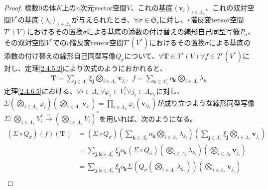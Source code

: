 \documentclass[dvipdfmx]{jsarticle}
\begin{document}
\begin{proof}
標数$0$の体$K$上の$n$次元vector空間$V$、これの基底$\left\langle \mathbf{v}_{i} \right\rangle_{i \in \varLambda_{n}}$、これの双対空間$V^{*}$の基底$\left\langle \lambda_{i} \right\rangle_{i \in \varLambda_{n}}$が与えられたとき、$\forall\sigma \in \mathfrak{S}_{r}$に対し、$r$階反変tensor空間$T^{r}(V)$におけるその置換$\sigma$による基底の添数の付け替えの線形自己同型写像$P_{\sigma}$、その双対空間$V^{*}$での$r$階反変tensor空間$T^{r}(V^{*})$におけるその置換$\sigma$による基底の添数の付け替えの線形自己同型写像$Q_{\sigma}$について、$\forall\mathbf{T} \in T^{r}(V)\forall f \in T^{r}\left( V^{*} \right)$に対し、定理\ref{2.4.5.2}により次式のようにおかれると、
\begin{align*}
\mathbf{T} = \sum_{\mathbf{j} \in \varLambda_{n}^{r}} {\xi_{\mathbf{j}}\bigotimes_{i \in \varLambda_{r}} \mathbf{v}_{j_{i}}},\ \ f = \sum_{\mathbf{k} \in \varLambda_{n}^{r}} {o_{\mathbf{k}}\bigotimes_{i \in \varLambda_{r}} \lambda_{k_{i}}}
\end{align*}
定理\ref{2.4.6.5}における、$\forall i \in \varLambda_{n}\forall\varphi_{i} \in V_{i}^{*}\forall j_{i} \in \varLambda_{m_{i}}$に対し、$\varSigma\left( \bigotimes_{i \in \varLambda_{n}} \varphi_{i} \right)\left( \bigotimes_{i \in \varLambda_{n}} \mathbf{v}_{j_{i}} \right) = \prod_{i \in \varLambda_{n}} {\varphi_{i}\left( \mathbf{v}_{ij_{i}} \right)}$が成り立つような線形同型写像$\varSigma:\bigotimes_{i \in \varLambda_{n}} V_{i}^{*}\overset{\sim}{\rightarrow}\left( \bigotimes_{i \in \varLambda_{n}} V_{i} \right)^{*}$を用いれば、次のようになる。
\begin{align*}
\left( \varSigma \circ Q_{\sigma} \right)(f)\left( \mathbf{T} \right) &= \left( \varSigma \circ Q_{\sigma} \right)\left( \sum_{\mathbf{k} \in \varLambda_{n}^{r}} {o_{\mathbf{k}}\bigotimes_{i \in \varLambda_{r}} \lambda_{k_{i}}} \right)\left( \sum_{\mathbf{j} \in \varLambda_{n}^{r}} {\xi_{\mathbf{j}}\bigotimes_{i \in \varLambda_{r}} \mathbf{v}_{j_{i}}} \right)\\
&= \sum_{\mathbf{j},\mathbf{k} \in \varLambda_{n}^{r}} {\xi_{\mathbf{j}}o_{\mathbf{k}}\left( \varSigma \circ Q_{\sigma} \right)\left( \bigotimes_{i \in \varLambda_{r}} \lambda_{k_{i}} \right)\left( \bigotimes_{i \in \varLambda_{r}} \mathbf{v}_{j_{i}} \right)}\\
&= \sum_{\mathbf{j},\mathbf{k} \in \varLambda_{n}^{r}} {\xi_{\mathbf{j}}o_{\mathbf{k}}\varSigma\left( Q_{\sigma}\left( \bigotimes_{i \in \varLambda_{r}} \lambda_{k_{i}} \right) \right)\left( \bigotimes_{i \in \varLambda_{r}} \mathbf{v}_{j_{i}} \right)}\\

\end{align*}
\end{proof}
\end{document}
